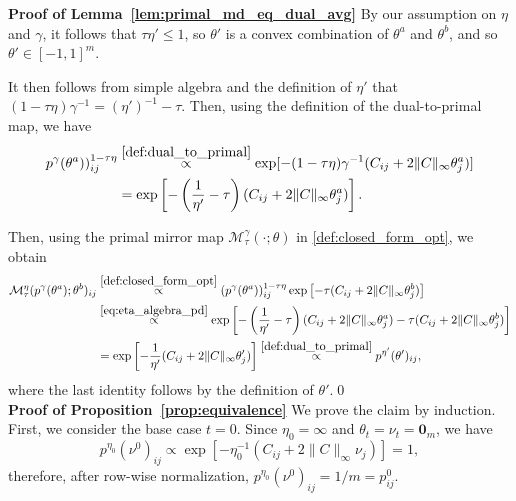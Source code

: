 \documentclass[10pt]{article}
\theoremstyle{plain}
\theoremstyle{definition}
\theoremstyle{remark}
\newcommand{\zero}{\mathbf{0}}
\begin{document}
\noindent\textbf{Proof of Lemma~\ref{lem:primal_md_eq_dual_avg}}
    By our assumption on $\eta$ and $\gamma$, it follows that $\tau\eta'\leq 1$, so $\theta'$ is a convex combination of $\theta^a$ and $\theta^b$, and so $\theta'\in[-1,1]^m$. 
    
    It then follows from simple algebra and the definition of $\eta'$ that $(1-\tau\eta)\gamma^{-1} = (\eta')^{-1} - \tau$. Then, using the definition of the dual-to-primal map, we have
    \begin{align}
        p^\gamma(\theta^a))^{1-\tau\eta}_{ij}&\stackrel{\eqref{def:dual_to_primal}}\propto\exp[-(1-\tau\eta)\gamma^{-1}(C_{ij}+2\|C\|_\infty\theta_j^a)] \nonumber\\
        &=\exp\left[-\left(\frac1{\eta'}-\tau\right)(C_{ij}+2\|C\|_\infty\theta_j^a)\right].\label{eq:eta_algebra_pd}
    \end{align}
    
    
    Then, using the primal mirror map $\mathcal{M}^\gamma_{\tau}(\cdot;\theta)$ in \eqref{def:closed_form_opt}, we obtain
    \begin{align*}
        \mathcal{M}^\eta_{\tau}(p^\gamma(\theta^a);\theta^b)_{ij} &\stackrel{\eqref{def:closed_form_opt}}\propto(p^\gamma(\theta^a))^{1-\tau\eta}_{ij}\exp\left[-\tau(C_{ij}+2\|C\|_\infty\theta^b_j)\right]\\
        &\stackrel{\eqref{eq:eta_algebra_pd}}\propto\exp\left[-\left(\frac1{\eta'}-\tau\right)(C_{ij}+2\|C\|_\infty\theta_j^a) -\tau(C_{ij}+2\|C\|_\infty\theta^b_j)\right]\\
        &=\exp\left[-\frac1{\eta'}(C_{ij}+2\|C\|_\infty\theta_j')\right]\stackrel{\eqref{def:dual_to_primal}}\propto p^{\eta'}(\theta')_{ij},
    \end{align*}
    where the last identity follows by the definition of $\theta'$.\qed\\
\noindent\textbf{Proof of Proposition~\ref{prop:equivalence}}
    We prove the claim by induction. First, we consider the base case $t=0$. Since $\eta_0=\infty$ and $\theta_t=\nu_t=\zero_m$, we have
    \begin{equation*}
        p^{\eta_0}(\nu^0)_{ij}\propto\exp[-\eta_0^{-1}(C_{ij}+2\|C\|_\infty \nu_j)]=1,
    \end{equation*}
    therefore, after row-wise normalization, $p^{\eta_0}(\nu^0)_{ij}=1/m=p^0_{ij}$.
\end{document}
